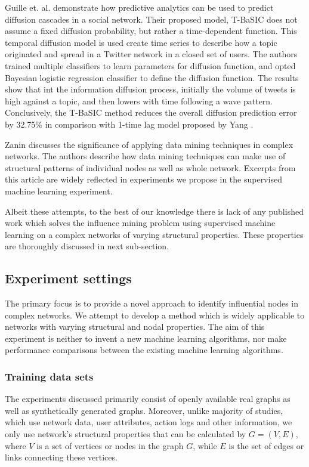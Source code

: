 	Guille et. al. \cite{guille2013} demonstrate how predictive analytics can be used to predict diffusion cascades in a social network. Their proposed model, T-BaSIC does not assume a fixed diffusion probability, but rather a time-dependent function. This temporal diffusion model is used create time series to describe how a topic originated and spread in a Twitter network in a closed set of users. The authors trained multiple classifiers to learn parameters for diffusion function, and opted Bayesian logistic regression classifier to define the diffusion function. The results show that int the information diffusion process, initially the volume of tweets is high against a topic, and then lowers with time following a wave pattern. Conclusively, the T-BaSIC method reduces the overall diffusion prediction error by 32.75\% in comparison with 1-time lag model proposed by Yang \cite{yang2011}.
	
	Zanin \cite{zanin2016} discusses the significance of applying data mining techniques in complex networks. The authors describe how data mining techniques can make use of structural patterns of individual nodes as well as whole network. Excerpts from this article are widely reflected in experiments we propose in the supervised machine learning experiment.
	
	Albeit these attempts, to the best of our knowledge there is lack of any published work which solves the influence mining problem using supervised machine learning on a complex networks of varying structural properties. These properties are thoroughly discussed in next sub-section.
	
		\subsection{Experiment settings}
		The primary focus is to provide a novel approach to identify influential nodes in complex networks. We attempt to develop a method which is widely applicable to networks with varying structural and nodal properties. The aim of this experiment is neither to invent a new machine learning algorithms, nor make performance comparisons between the existing machine learning algorithms.
		
			\subsubsection{Training data sets}
			The experiments discussed primarily consist of openly available real graphs as well as synthetically generated graphs. Moreover, unlike majority of studies, which use network data, user attributes, action logs and other information, we only use network’s structural properties that can be calculated by $G=(V,E)$, where $V$ is a set of vertices or nodes in the graph $G$, while $E$ is the set of edges or links connecting these vertices.
			
